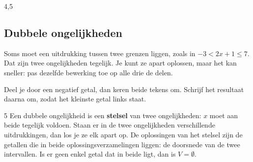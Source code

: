 \begin{alleenvoor}{4,5}
\subsection{Dubbele ongelijkheden}

Soms moet een uitdrukking tussen twee grenzen liggen, zoals in $-3 < 2x + 1 \leqslant 7$. Dat zijn twee ongelijkheden tegelijk. Je kunt ze apart oplossen, maar het kan sneller: pas dezelfde bewerking toe op alle drie de delen.


Deel je door een negatief getal, dan keren beide tekens om. Schrijf het resultaat daarna om, zodat het kleinste getal links staat.


\begin{oefeningen}
\end{oefeningen}

\begin{alleenvoor}{5}
Een dubbele ongelijkheid is een \textbf{\textcolor{accent}{stelsel}} van twee ongelijkheden: $x$ moet aan beide tegelijk voldoen. Staan er in de twee ongelijkheden verschillende uitdrukkingen, dan los je ze elk apart op. De oplossingen van het stelsel zijn de getallen die in beide oplossingsverzamelingen liggen: de doorsnede van de twee intervallen. Is er geen enkel getal dat in beide ligt, dan is $V = \emptyset$.


\end{alleenvoor}
\end{alleenvoor}
